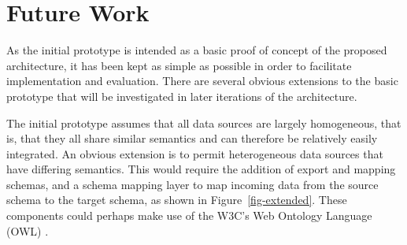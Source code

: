 \documentclass{CRPITStyle}
\begin{document}
%
%


\section{Future Work}
\label{sec-future-work}

As the initial prototype is intended as a basic proof of concept of the
proposed architecture, it has been kept as simple as possible in order
to facilitate implementation and evaluation. There are several obvious
extensions to the basic prototype that will be investigated in later
iterations of the architecture.

The initial prototype assumes that all data sources are largely
homogeneous, that is, that they all share similar semantics and can
therefore be relatively easily integrated. An obvious extension is to
permit heterogeneous data sources that have differing semantics. This
would require the addition of export and mapping schemas, and a schema
mapping layer to map incoming data from the source schema to the target
schema, as shown in Figure~\ref{fig-extended}. These components could
perhaps make use of the W3C's Web Ontology Language (OWL)
\cite{McGu-DL-2004-OWL}.
\end{document}
